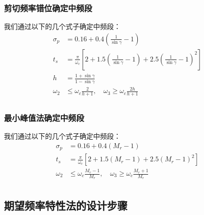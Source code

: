 \subsubsection{剪切频率错位确定中频段}
我们通过以下的几个式子确定中频段：
\begin{equation*}
    \begin{split}
        \sigma_p &= 0.16 + 0.4\left(\frac{1}{\sin \gamma} - 1\right) \\
        t_s &= \frac{\pi}{\omega_c} \left[ 2 + 1.5 \left( \frac{1}{\sin \gamma} - 1\right) + 2.5 \left(\frac{1}{\sin \gamma} - 1\right)^2\right] \\ 
        h &= \frac{1 + \sin \gamma}{1-\sin\gamma} \\
        \omega_2 & \leq \omega_c \frac{2}{h+1} , \quad \omega_3 \geq \omega_c \frac{2h}{h+1}\\
    \end{split}
\end{equation*}

\subsubsection{最小峰值法确定中频段}

我们通过以下的几个式子确定中频段：
\begin{equation*}
    \begin{split}
        \sigma_p &= 0.16 + 0.4\left(M_r - 1\right) \\
        t_s &= \frac{\pi}{\omega_c} \left[ 2 + 1.5 \left( M_r - 1\right) + 2.5 \left(M_r - 1\right)^2\right] \\ 
        \omega_2 & \leq \omega_c \frac{M_r - 1}{M_r} , \quad \omega_3 \geq \omega_c \frac{M_r+1}{M_r}\\
    \end{split}
\end{equation*}

\subsection{期望频率特性法的设计步骤}

